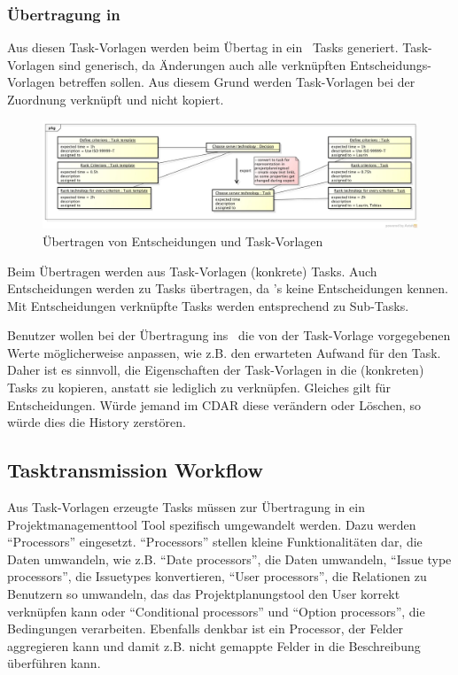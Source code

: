 			\subsubsection{Übertragung in \ppt}
				Aus diesen Task-Vorlagen werden beim Übertag in ein \ppt\ Tasks generiert.
				Task-Vorlagen sind generisch, da Änderungen auch alle verknüpften Entscheidungs-Vorlagen betreffen sollen.
				Aus diesem Grund werden Task-Vorlagen bei der Zuordnung verknüpft und nicht kopiert.
				
				\begin{figure}[H]
					\includegraphics[width=\textwidth]{architecture/media/img/DecisionTaskRelation.jpg}
					\centering
					\caption{Übertragen von Entscheidungen und Task-Vorlagen}
					\label{fig:DecisionTaskRelation}
				\end{figure}
				
				Beim Übertragen werden aus Task-Vorlagen (konkrete) Tasks.
				Auch Entscheidungen werden zu Tasks übertragen, da \ppt's keine Entscheidungen kennen.
				Mit Entscheidungen verknüpfte Tasks werden entsprechend zu Sub-Tasks.
				
				Benutzer wollen bei der Übertragung ins \ppt\ die von der Task-Vorlage vorgegebenen Werte möglicherweise anpassen, wie z.B. den erwarteten Aufwand für den Task.
				Daher ist es sinnvoll, die Eigenschaften der Task-Vorlagen in die (konkreten) Tasks zu kopieren, anstatt sie lediglich zu verknüpfen.
				Gleiches gilt für Entscheidungen. Würde jemand im CDAR diese verändern oder Löschen, so würde dies die History zerstören.
			
		
		\subsection{Tasktransmission Workflow}
			Aus Task-Vorlagen erzeugte Tasks müssen zur Übertragung in ein Projektmanagementtool
			Tool spezifisch umgewandelt werden. Dazu werden "`Processors"' eingesetzt.
			"`Processors"' stellen kleine Funktionalitäten dar, die Daten umwandeln, wie z.B. "`Date processors"', die Daten umwandeln, "`Issue type processors"', die Issuetypes konvertieren, "`User processors"', die Relationen zu Benutzern so umwandeln, das das Projektplanungstool den User korrekt verknüpfen kann oder "`Conditional processors"' und "`Option processors"', die Bedingungen verarbeiten.
			Ebenfalls denkbar ist ein Processor, der Felder aggregieren kann und damit z.B. nicht gemappte Felder in die Beschreibung überführen kann.
			
